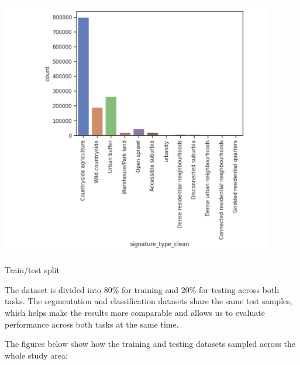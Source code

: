\documentclass[
  letterpaper,
  DIV=11,
  numbers=noendperiod]{scrartcl}
\makeatletter
\let\oldparagraph\paragraph
\renewcommand{\paragraph}{
    \@ifstar
      \xxxParagraphStar
      \xxxParagraphNoStar
  }
\newcommand{\xxxParagraphStar}[1]{\oldparagraph*{#1}\mbox{}}
\newcommand{\xxxParagraphNoStar}[1]{\oldparagraph{#1}\mbox{}}
\makeatother
\begin{document}
\begin{center}
\includegraphics[width=\linewidth,height=4.375in,keepaspectratio]{../figures/algo_design/unbalanced.png}
\end{center}

\paragraph{Train/test split}\label{traintest-split}

The dataset is divided into 80\% for training and 20\% for testing
across both tasks. The segmentation and classification datasets share
the same test samples, which helps make the results more comparable and
allows us to evaluate performance across both tasks at the same time.

The figures below show how the training and testing datasets sampled
across the whole study area:
\end{document}
